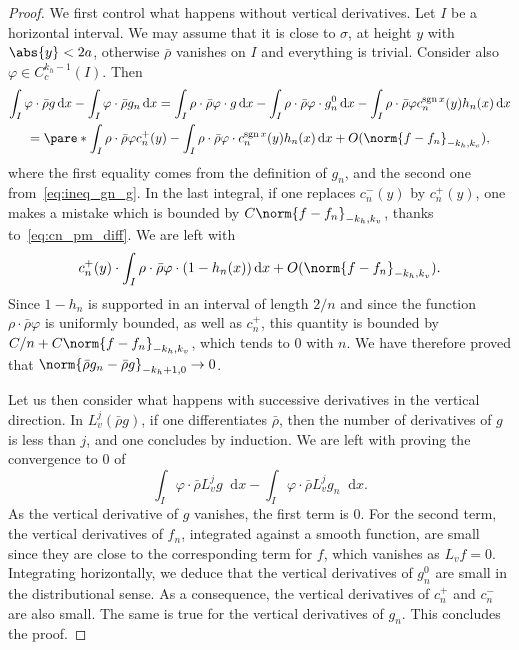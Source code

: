 \documentclass[11pt, a4paper, oneside, final, pagebackref]{amsart}
\newcommand{\dd}{\mathop{}\!\mathrm{d}}
\DeclareMathOperator{\sgn}{sgn}
\renewcommand{\phi}{\varphi}
\theoremstyle{definition}
\numberwithin{equation}{section}
\begin{document}
\begin{proof}
We first control what happens without vertical derivatives. Let $I$ be a
horizontal interval. We may assume that it is close to $\sigma$, at height
$y$ with $\abs{y}<2a$, otherwise $\bar\rho$ vanishes on $I$ and everything is
trivial. Consider also $\phi \in C^{k_h-1}_c(I)$. Then
\begin{multline*}
  \int_I \phi \cdot \bar\rho g \dd x - \int_I \phi \cdot \bar\rho g_n \dd x
  = \int_I \rho \cdot \bar\rho \phi \cdot g \dd x - \int_I \rho \cdot \bar\rho \phi \cdot g_n^0 \dd x
  - \int_I \rho \cdot \bar\rho \phi c_n^{\sgn x}(y) h_n(x) \dd x
  \\ =\pare*{\int_I \rho \cdot \bar\rho \phi} c_n^+(y) - \int_I \rho \cdot \bar\rho \phi \cdot c_n^{\sgn x}(y) h_n(x) \dd x
  + O(\norm{f-f_n}_{-k_h, k_v}),
\end{multline*}
where the first equality comes from the definition of $g_n$, and the second
one from~\eqref{eq:ineq_gn_g}. In the last integral, if one replaces
$c_n^-(y)$ by $c_n^+(y)$, one makes a mistake which is bounded by
$C\norm{f-f_n}_{-k_h, k_v}$, thanks to~\eqref{eq:cn_pm_diff}. We are left
with
\begin{equation*}
  c_n^+(y) \cdot \int_I \rho \cdot \bar\rho \phi \cdot (1-h_n(x)) \dd x + O(\norm{f-f_n}_{-k_h, k_v}).
\end{equation*}
Since $1-h_n$ is supported in an interval of length $2/n$ and since the
function $\rho \cdot \bar\rho \phi$ is uniformly bounded, as well as $c_n^+$,
this quantity is bounded by $C/n + C \norm{f-f_n}_{-k_h, k_v}$, which tends
to $0$ with $n$. We have therefore proved that $\norm{\bar\rho g_n - \bar
\rho g}_{-k_h+1, 0} \to 0$.

Let us then consider what happens with successive derivatives in the vertical
direction. In $L_v^j(\bar \rho g)$, if one differentiates $\bar \rho$, then
the number of derivatives of $g$ is less than $j$, and one concludes by
induction. We are left with proving the convergence to $0$ of
\begin{equation*}
  \int_I \phi \cdot \bar\rho L_v^j g \dd x - \int_I \phi \cdot \bar\rho L_v^j g_n \dd x.
\end{equation*}
As the vertical derivative of $g$ vanishes, the first term is $0$. For the
second term, the vertical derivatives of $f_n$, integrated against a smooth
function, are small since they are close to the corresponding term for $f$,
which vanishes as $L_v f = 0$. Integrating horizontally, we deduce that the
vertical derivatives of $g_n^0$ are small in the distributional sense. As a
consequence, the vertical derivatives of $c_n^+$ and $c_n^-$ are also small.
The same is true for the vertical derivatives of $g_n$. This concludes the
proof.
\end{proof}
\end{document}
